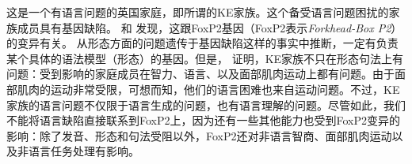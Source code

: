 这是一个有语言问题的英国家庭，即所谓的KE家族。这个备受语言问题困扰的家族成员具有基因缺陷。 \citet{FVKWMP98a}和 \citet{LFHVM2001a}发现，这跟FoxP2基因（FoxP2表示\emph{Forkhead-Box P2}）的变异有关。 \citet{GC91a}从形态方面的问题遗传于基因缺陷这样的事实中推断，一定有负责某个具体的语法模型（形态）的基因。但是， \citet[]{VKWAFP95a}证明，KE家族不只在形态句法上有问题：受到影响的家庭成员在智力、语言、以及面部肌肉运动上都有问题。由于面部肌肉的运动非常受限，可想而知，他们的语言困难也来自运动问题\citep[]{Tomasello2003a}。不过，KE家族的语言问题不仅限于语言生成的问题，也有语言理解的问题\citep[]{Bishop2002a}。尽管如此，我们不能将语言缺陷直接联系到FoxP2上，因为还有一些其他能力也受到FoxP2变异的影响：除了发音、形态和句法受阻以外，FoxP2还对非语言智商、面部肌肉运动以及非语言任务处理有影响\citep{VKWAFP95a}。

